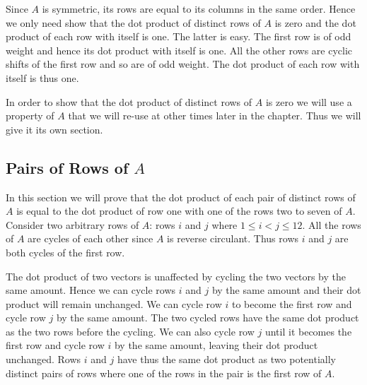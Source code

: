 Since $A$ is symmetric, its rows are equal to its columns in the same order.
Hence we only need show that the dot product of distinct rows of $A$ is zero and the dot product of each row with itself is one.
The latter is easy.
The first row is of odd weight and hence its dot product with itself is one.
All the other rows are cyclic shifts of the first row and so are of odd weight.
The dot product of each row with itself is thus one.

In order to show that the dot product of distinct rows of $A$ is zero we will use a property of $A$ that we will re-use at other times later in the chapter.
Thus we will give it its own section.

\subsection{Pairs of Rows of $A$}
\label{sect:pairsrows}
In this section we will prove that the dot product of each pair of distinct rows of $A$ is equal to the dot product of row one with one of the rows two to seven of $A$.
Consider two arbitrary rows of $A$: rows $i$ and $j$ where $1 \leq i < j \leq 12$.
All the rows of $A$ are cycles of each other since $A$ is reverse circulant.
Thus rows $i$ and $j$ are both cycles of the first row.

The dot product of two vectors is unaffected by cycling the two vectors by the same amount.
Hence we can cycle rows $i$ and $j$ by the same amount and their dot product will remain unchanged.
We can cycle row $i$ to become the first row and cycle row $j$ by the same amount.
The two cycled rows have the same dot product as the two rows before the cycling.
We can also cycle row $j$ until it becomes the first row and cycle row $i$ by the same amount, leaving their dot product unchanged.
Rows $i$ and $j$ have thus the same dot product as two potentially distinct pairs of rows where one of the rows in the pair is the first row of $A$.

